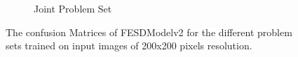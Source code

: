 \begin{figure}[htbp]
\begin{subfigure}[b]{0.35\linewidth}
      \caption{Joint Problem Set}
      \label{fig:hi_jt_conf}
  \end{subfigure}
  \caption[Confusion Matrices of FESDModelv2 (200x200 pixels input resolution)]{The confusion Matrices of FESDModelv2 for the different problem sets trained on input images of 200x200 pixels resolution.}
  \label{fig:hi_conf_v2}
\end{figure}

\FloatBarrier
